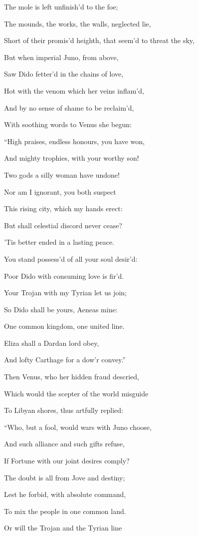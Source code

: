 The mole is left unfinish’d to the foe;

The mounds, the works, the walls, neglected lie,

Short of their promis’d heighth, that seem’d to threat the sky,

But when imperial Juno, from above,

Saw Dido fetter’d in the chains of love,

Hot with the venom which her veins inflam’d,

And by no sense of shame to be reclaim’d,

With soothing words to Venus she begun:

“High praises, endless honours, you have won,

And mighty trophies, with your worthy son!

Two gods a silly woman have undone!

Nor am I ignorant, you both suspect

This rising city, which my hands erect:

But shall celestial discord never cease?

’Tis better ended in a lasting peace.

You stand possess’d of all your soul desir’d:

Poor Dido with consuming love is fir’d.

Your Trojan with my Tyrian let us join;

So Dido shall be yours, Aeneas mine:

One common kingdom, one united line.

Eliza shall a Dardan lord obey,

And lofty Carthage for a dow’r convey.”

Then Venus, who her hidden fraud descried,

Which would the scepter of the world misguide

To Libyan shores, thus artfully replied:

“Who, but a fool, would wars with Juno choose,

And such alliance and such gifts refuse,

If Fortune with our joint desires comply?

The doubt is all from Jove and destiny;

Lest he forbid, with absolute command,

To mix the people in one common land.

Or will the Trojan and the Tyrian line

